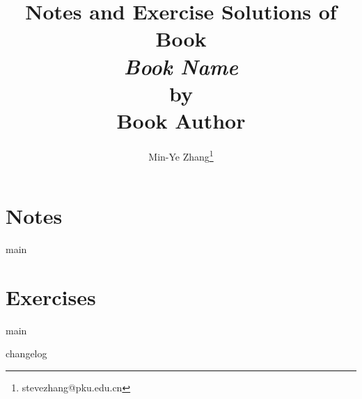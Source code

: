 \documentclass[a4paper,12pt]{report}
\newcommand{\booktitle}{Book Name}
\newcommand{\bookauthor}{Book Author}
\begin{document}
\title{Notes and Exercise Solutions of Book \\ \textit{\booktitle} \\ by \\ \bookauthor}
\author{Min-Ye Zhang\thanks{stevezhang@pku.edu.cn}}

\maketitle
\clearpage
\tableofcontents
\clearpage

\part{Notes}
{main}
\part{Exercises}
{main}

\begin{appendices}
{changelog}
\end{appendices}

\end{document}
